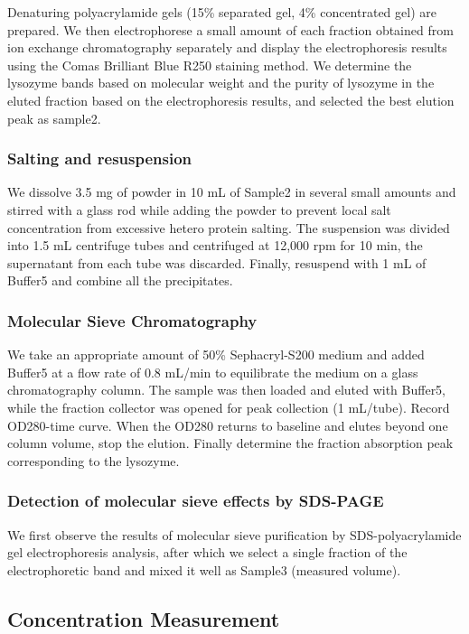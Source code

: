 Denaturing polyacrylamide gels (15\% separated gel, 4\% concentrated
gel) are prepared. We then electrophorese a small amount of each
fraction obtained from ion exchange chromatography separately and
display the electrophoresis results using the Comas Brilliant Blue
R250 staining method. We determine the lysozyme bands based on
molecular weight and the purity of lysozyme in the eluted fraction based
on the electrophoresis results, and selected the best elution peak as
sample2.

\subsubsection{Salting and resuspension}

We dissolve 3.5 mg of  powder in 10 mL of Sample2 in several
small amounts and stirred with a glass rod while adding the powder to
prevent local salt concentration from excessive hetero protein salting.
The suspension was divided into 1.5 mL centrifuge tubes and centrifuged
at 12,000 rpm for 10 min, the supernatant from each tube was discarded.
Finally, resuspend with 1 mL of Buffer5 and combine all the
precipitates.

\subsubsection{Molecular Sieve Chromatography}

We take an appropriate amount of 50\% Sephacryl-S200 medium and added
Buffer5 at a flow rate of 0.8 mL/min to equilibrate the medium on a
glass chromatography column. The sample was then loaded and eluted with
Buffer5, while the fraction collector was opened for peak collection (1
mL/tube). Record OD280-time curve. When the OD280 returns to baseline
and elutes beyond one column volume, stop the elution. Finally determine
the fraction absorption peak corresponding to the lysozyme.

\subsubsection{Detection of molecular sieve effects by SDS-PAGE}

We first observe the results of molecular sieve purification by
SDS-polyacrylamide gel electrophoresis analysis, after which we select
a single fraction of the electrophoretic band and mixed it well as
Sample3 (measured volume).

\hypertarget{concentration-measurement}{%
	\subsection{Concentration Measurement}\label{concentration-measurement}}

